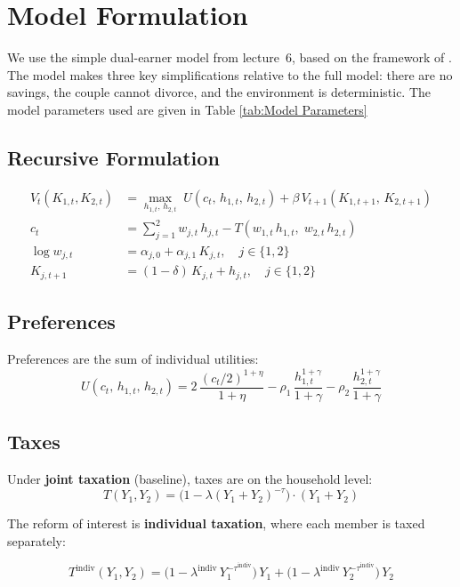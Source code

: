 \section*{Model Formulation}

We use the simple dual-earner model from lecture~6, based on the framework of \cite{borella2023}. The model makes three key simplifications relative to the full model: there are
no savings, the couple cannot divorce, and the environment is deterministic. The model parameters used are given in Table \ref{tab:Model Parameters}

\subsection*{Recursive Formulation}

\begin{align}
    V_t(K_{1,t},K_{2,t})
    &= \max_{h_{1,t},\,h_{2,t}} \;
       U(c_t,\,h_{1,t},\,h_{2,t})
       + \beta\, V_{t+1}(K_{1,t+1},\,K_{2,t+1}) \\[6pt]
    c_t &= \sum_{j=1}^{2} w_{j,t}\,h_{j,t}
           - T(w_{1,t}\,h_{1,t},\; w_{2,t}\,h_{2,t}) \\[6pt]
    \log w_{j,t} &= \alpha_{j,0} + \alpha_{j,1}\,K_{j,t},
        \quad j \in \{1,2\} \\[6pt]
    K_{j,t+1} &= (1-\delta)\,K_{j,t} + h_{j,t},
        \quad j \in \{1,2\}
\end{align}


\subsection*{Preferences}

Preferences are the sum of individual utilities:
\begin{equation}
    U(c_t,\,h_{1,t},\,h_{2,t})
    = 2\,\frac{(c_t/2)^{1+\eta}}{1+\eta}
      - \rho_1\,\frac{h_{1,t}^{1+\gamma}}{1+\gamma}
      - \rho_2\,\frac{h_{2,t}^{1+\gamma}}{1+\gamma}
\end{equation}

\subsection*{Taxes}

Under \textbf{joint taxation} (baseline), taxes are on the household level:
\begin{equation}
    T(Y_1,Y_2) = \bigl(1 - \lambda(Y_1+Y_2)^{-\tau}\bigr) \cdot (Y_1+Y_2)
\end{equation}

The reform of interest is \textbf{individual taxation}, where each member is taxed separately:

\begin{equation}
    T^{\text{indiv}}(Y_1,Y_2)
    = \bigl(1 - \lambda^{\text{indiv}}\,Y_1^{-\tau^{\text{indiv}}}\bigr)\,Y_1
    + \bigl(1 - \lambda^{\text{indiv}}\,Y_2^{-\tau^{\text{indiv}}}\bigr)\,Y_2
\end{equation}
